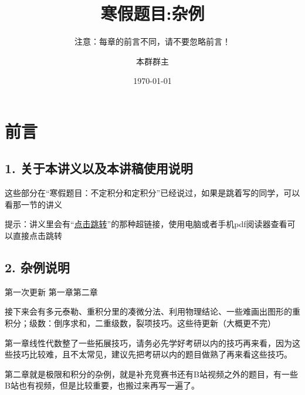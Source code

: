 \documentclass[lang=cn,newtx,10pt,scheme=chinese]{elegantbook}
\title{寒假题目:杂例} %
\subtitle{注意：每章的前言不同，请不要忽略前言！ }
\author{本群群主}
\institute{本群}
\date{\today}
\begin{document}
\maketitle
\frontmatter

\newpage

\section*{前言}

\subsection*{\textbf{1. 关于本讲义以及本讲稿使用说明}}
这些部分在“寒假题目：不定积分和定积分”已经说过，如果是跳着写的同学，可以看那一节的讲义

提示：讲义里会有“\href{https://www.bilibili.com/video/BV1GJ411x7h7/?share_source=copy_web&vd_source=270527b9d8a800872b201575fba2747c}{点击跳转}”的那种超链接，使用电脑或者手机pdf阅读器查看可以直接点击跳转

\subsection*{\textbf{2. 杂例说明}}
第一次更新 第一章第二章

接下来会有多元泰勒、重积分里的凑微分法、利用物理结论、一些难画出图形的重积分；级数：倒序求和，二重级数，裂项技巧。这些待更新（大概更不完）

第一章线性代数整了一些拓展技巧，请务必先学好考研以内的技巧再来看，因为这些技巧比较难，且不太常见，建议先把考研以内的题目做熟了再来看这些技巧。

第二章就是极限和积分的杂例，就是补充竞赛书还有B站视频之外的题目，有一些B站也有视频，但是比较重要，也搬过来再写一遍了。
\newpage

\tableofcontents
\mainmatter

\newpage

\end{document}
